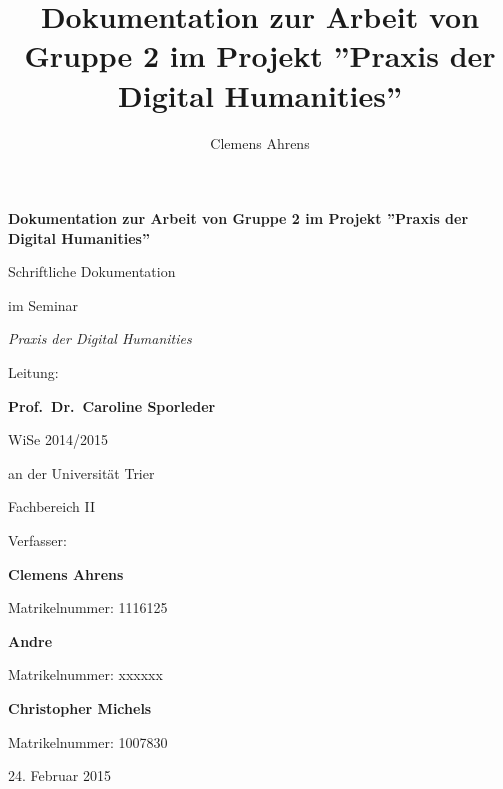\documentclass[a4paper,12pt,titlepage=true, ngerman]{scrartcl}
\title{Dokumentation zur Arbeit von Gruppe 2 im Projekt ''Praxis der Digital Humanities''} %
\author{Clemens Ahrens}
\begin{document}
\begin{titlepage}

\begin{center}

\vspace*{100pt}

\textbf{\Large{Dokumentation zur Arbeit von Gruppe 2 im Projekt ''Praxis der Digital Humanities''}}%

\vfill

Schriftliche Dokumentation

im Seminar

\emph{Praxis der Digital Humanities}


Leitung:

\textbf{Prof.\ Dr.\ Caroline Sporleder}%

WiSe 2014/2015%

\bigskip
\bigskip

an der Universität Trier

Fachbereich II

\bigskip
\bigskip

Verfasser:


\textbf{Clemens Ahrens}

Matrikelnummer: 1116125

\textbf{Andre} %

Matrikelnummer: xxxxxx

\textbf{Christopher Michels}

Matrikelnummer: 1007830

\bigskip
\bigskip

24. Februar 2015

\vfill

\end{center}

\end{titlepage}







\newpage

 \tableofcontents%
\end{document}
